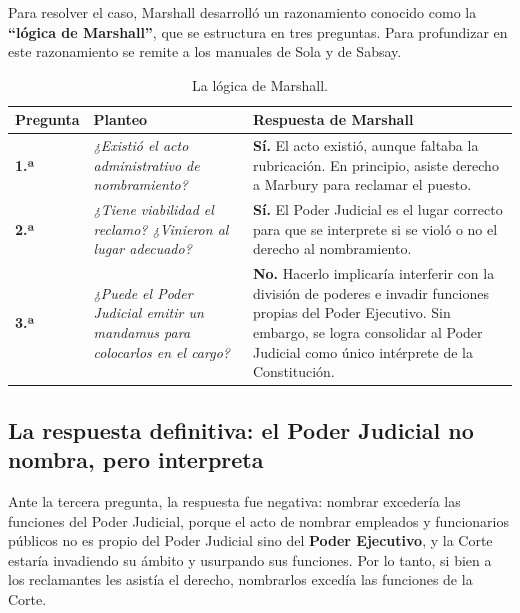 \documentclass[12pt,oneside,a4paper]{book}
\begin{document}
Para resolver el caso, Marshall desarrolló un razonamiento conocido como la \textbf{``lógica de Marshall''}, que se estructura en tres preguntas. Para profundizar en este razonamiento se remite a los manuales de Sola y de Sabsay.

\begin{table}[H]
\centering
\begin{tabularx}{\textwidth}{
    >{\centering\arraybackslash}p{}
    >{\raggedright\arraybackslash}X
    >{\raggedright\arraybackslash}X
}
\toprule
\textbf{Pregunta} & \textbf{Planteo} & \textbf{Respuesta de Marshall} \\
\midrule
\textbf{1.ª} & \textit{¿Existió el acto administrativo de nombramiento?} & \textbf{Sí.} El acto existió, aunque faltaba la rubricación. En principio, asiste derecho a Marbury para reclamar el puesto. \\
\addlinespace
\textbf{2.ª} & \textit{¿Tiene viabilidad el reclamo? ¿Vinieron al lugar adecuado?} & \textbf{Sí.} El Poder Judicial es el lugar correcto para que se interprete si se violó o no el derecho al nombramiento. \\
\addlinespace
\textbf{3.ª} & \textit{¿Puede el Poder Judicial emitir un mandamus para colocarlos en el cargo?} & \textbf{No.} Hacerlo implicaría interferir con la división de poderes e invadir funciones propias del Poder Ejecutivo. Sin embargo, se logra consolidar al Poder Judicial como único intérprete de la Constitución. \\
\bottomrule
\end{tabularx}
\caption{La lógica de Marshall.}
\end{table}

\subsection{La respuesta definitiva: el Poder Judicial no nombra, pero interpreta}

Ante la tercera pregunta, la respuesta fue negativa: nombrar excedería las funciones del Poder Judicial, porque el acto de nombrar empleados y funcionarios públicos no es propio del Poder Judicial sino del \textbf{Poder Ejecutivo}, y la Corte estaría invadiendo su ámbito y usurpando sus funciones. Por lo tanto, si bien a los reclamantes les asistía el derecho, nombrarlos excedía las funciones de la Corte.
\end{document}

